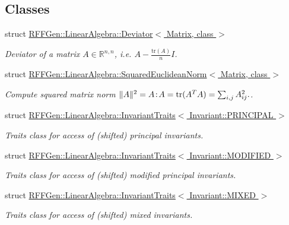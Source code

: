 \subsection*{Classes}
\begin{DoxyCompactItemize}
\item 
struct \hyperlink{structRFFGen_1_1LinearAlgebra_1_1Deviator}{R\-F\-F\-Gen\-::\-Linear\-Algebra\-::\-Deviator$<$ Matrix, class $>$}
\begin{DoxyCompactList}\small\item\em Deviator of a matrix $ A\in\mathbb{R}^{n,n} $, i.\-e. $ A - \frac{\mathrm{tr}(A)}{n}I $. \end{DoxyCompactList}\item 
struct \hyperlink{structRFFGen_1_1LinearAlgebra_1_1SquaredEuclideanNorm}{R\-F\-F\-Gen\-::\-Linear\-Algebra\-::\-Squared\-Euclidean\-Norm$<$ Matrix, class $>$}
\begin{DoxyCompactList}\small\item\em Compute squared matrix norm $ \|A\|^2 = A\negthinspace : \negthinspace A = \mathrm{tr}(A^TA) = \sum_{i,j} A_{ij}^2. $. \end{DoxyCompactList}\item 
struct \hyperlink{structRFFGen_1_1LinearAlgebra_1_1InvariantTraits_3_01Invariant_1_1PRINCIPAL_01_4}{R\-F\-F\-Gen\-::\-Linear\-Algebra\-::\-Invariant\-Traits$<$ Invariant\-::\-P\-R\-I\-N\-C\-I\-P\-A\-L $>$}
\begin{DoxyCompactList}\small\item\em Traits class for access of (shifted) principal invariants. \end{DoxyCompactList}\item 
struct \hyperlink{structRFFGen_1_1LinearAlgebra_1_1InvariantTraits_3_01Invariant_1_1MODIFIED_01_4}{R\-F\-F\-Gen\-::\-Linear\-Algebra\-::\-Invariant\-Traits$<$ Invariant\-::\-M\-O\-D\-I\-F\-I\-E\-D $>$}
\begin{DoxyCompactList}\small\item\em Traits class for access of (shifted) modified principal invariants. \end{DoxyCompactList}\item 
struct \hyperlink{structRFFGen_1_1LinearAlgebra_1_1InvariantTraits_3_01Invariant_1_1MIXED_01_4}{R\-F\-F\-Gen\-::\-Linear\-Algebra\-::\-Invariant\-Traits$<$ Invariant\-::\-M\-I\-X\-E\-D $>$}
\begin{DoxyCompactList}\small\item\em Traits class for access of (shifted) mixed invariants. \end{DoxyCompactList}\item 

\end{DoxyCompactItemize}
